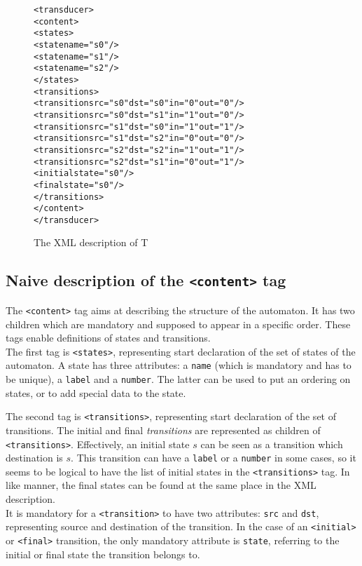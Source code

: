 \documentclass[a4paper]{llncs}
\def\contenttag{\texttt{<content>}}
\def\statestag{\texttt{<states>}}
\def\dstname{\texttt{dst}}
\def\srcname{\texttt{src}}
\def\transitionstag{\texttt{<transitions>}}
\def\transitiontag{\texttt{<transition>}}
\def\finaltag{\texttt{<final>}}
\def\initialtag{\texttt{<initial>}}
\def\nameattr{\texttt{name}}
\def\labelattr{\texttt{label}}
\def\numberattr{\texttt{number}}
\def\stateattr{\texttt{state}}
\begin{document}
\small
\begin{figure}[h]
  \begin{center}
\begin{alltt}
<transducer>
  <content>
    <states>
       <state name="s0"/>
       <state name="s1"/>
       <state name="s2"/>
    </states>
    <transitions>
       <transition \srcname{}="s0" \dstname{}="s0" in="0" out="0"/>
       <transition \srcname{}="s0" \dstname{}="s1" in="1" out="0"/>
       <transition \srcname{}="s1" \dstname{}="s0" in="1" out="1"/>
       <transition \srcname{}="s1" \dstname{}="s2" in="0" out="0"/>
       <transition \srcname{}="s2" \dstname{}="s2" in="1" out="1"/>
       <transition \srcname{}="s2" \dstname{}="s1" in="0" out="1"/>
       <initial state="s0"/>
       <final state="s0"/>
    </transitions>
  </content>
</transducer>
\end{alltt}

\caption{The XML description of T}
\label{bindiv3xml}
  \end{center}
\end{figure}

\newpage
\subsection{Naive description of the \contenttag{} tag}

The \contenttag{} tag aims at describing the structure of the
automaton. It has two children which are mandatory and supposed to appear in a
specific order. These tags enable definitions of states and
transitions. \\

The first tag is \statestag{}, representing start declaration of
the set of states of the automaton. A state has three attributes: a
\nameattr{} (which is mandatory and has to be unique), a \labelattr{}
and a \numberattr{}. The latter can be used to put an ordering on states,
or to add special data to the state.

The second tag is \transitionstag{}, representing start declaration
of the set of transitions. The initial and final
\textit{transitions} are represented as children of
\transitionstag{}. Effectively, an initial state $s$ can be seen as a transition
which destination is $s$. This transition can have a \labelattr{} or a
\numberattr{} in some cases, so it seems to be logical to have the list of
initial states in the \transitionstag{} tag. In like manner, the final
states can be found at the same place in the XML description.\\
It is mandatory for a \transitiontag{} to
have two attributes: \srcname{} and \dstname{}, representing source
and destination of the transition. In the case of an \initialtag{}
or \finaltag{} transition, the only mandatory attribute is
\stateattr{}, referring to the initial or final state the transition belongs to.\\
\end{document}
